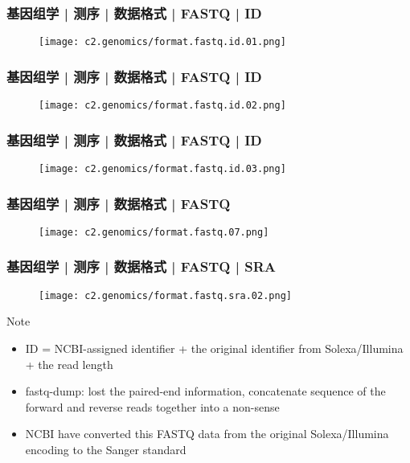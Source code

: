 \begin{frame}
  \frametitle{基因组学 | 测序 | 数据格式 | FASTQ | ID}
  \begin{figure}
    \centering
    \texttt{[image: c2.genomics/format.fastq.id.01.png]}
  \end{figure}
\end{frame}
    
\begin{frame}
  \frametitle{基因组学 | 测序 | 数据格式 | FASTQ | ID}
  \begin{figure}
    \centering
    \texttt{[image: c2.genomics/format.fastq.id.02.png]}
  \end{figure}
\end{frame}
    
\begin{frame}
  \frametitle{基因组学 | 测序 | 数据格式 | FASTQ | ID}
  \begin{figure}
    \centering
    \texttt{[image: c2.genomics/format.fastq.id.03.png]}
  \end{figure}
\end{frame}

\begin{frame}
  \frametitle{基因组学 | 测序 | 数据格式 | FASTQ}
  \begin{figure}
    \centering
    \texttt{[image: c2.genomics/format.fastq.07.png]}
  \end{figure}
\end{frame}
    
\begin{frame}
  \frametitle{基因组学 | 测序 | 数据格式 | FASTQ | SRA}
  \begin{figure}
    \centering
    \texttt{[image: c2.genomics/format.fastq.sra.02.png]}
  \end{figure}
  \begin{block}{Note}
    \begin{itemize}
      \item ID = NCBI-assigned identifier + the original identifier from Solexa/Illumina + the read length
      \item fastq-dump: lost the paired-end information, concatenate sequence of the forward and reverse reads together into a non-sense
      \item NCBI have converted this FASTQ data from the original Solexa/Illumina encoding to the Sanger standard
    \end{itemize}
  \end{block}
\end{frame}

